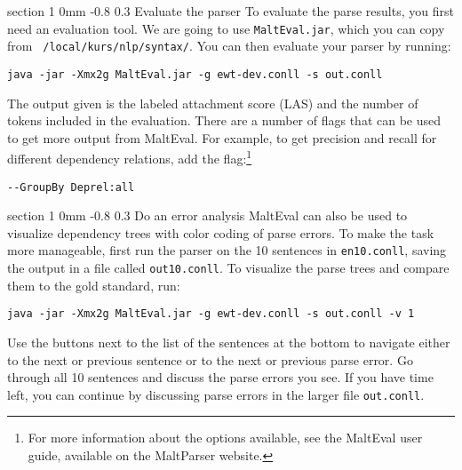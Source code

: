 \documentclass[10.9pt]{article}
\makeatletter
\newcommand{\newsec}[2]{\section{#1}\label{sec:#2}\noindent}
\renewcommand{\section}{\@startsection
{section}%
{1}%
{0mm}%
{-0.8\baselineskip}%
{0.3\baselineskip}%
{\bfseries\large}}%
\makeatother
\begin{document}
\newsec{Evaluate the parser}{eval}%
To evaluate the parse results, you first need an evaluation tool. We
are going to use {\tt MaltEval.jar}, which you can copy from {\tt
  /local/kurs/nlp/syntax/}. You can then evaluate your parser by
running:
\begin{small}
\begin{verbatim}
java -jar -Xmx2g MaltEval.jar -g ewt-dev.conll -s out.conll
\end{verbatim}
\end{small}
The output given is the labeled attachment score (LAS) and the number
of tokens included in the evaluation. There are a number of flags that
can be used to get more output from MaltEval. For example, to get
precision and recall for different dependency relations, add the
flag:\footnote{For more information about the options available, see
  the MaltEval user guide, available on the MaltParser website.}
\begin{small}
\begin{verbatim}
--GroupBy Deprel:all
\end{verbatim}
\end{small}

\newsec{Do an error analysis}{err}%
MaltEval can also be used to visualize dependency trees with color
coding of parse errors. To make the task more manageable, first run the parser
on the 10 sentences in {\tt en10.conll}, saving the output in a file called {\tt out10.conll}.
To visualize the parse trees and compare them to the gold standard, run:
\begin{small}
\begin{verbatim}
java -jar -Xmx2g MaltEval.jar -g ewt-dev.conll -s out.conll -v 1
\end{verbatim}
\end{small}
Use the buttons next to the list of the sentences at the bottom to
navigate either to the next or previous sentence or to the next or
previous parse error.
Go through all 10 sentences and discuss the parse errors you see.
If you have time left, you can continue by discussing parse errors in the larger file {\tt out.conll}.
\end{document}
